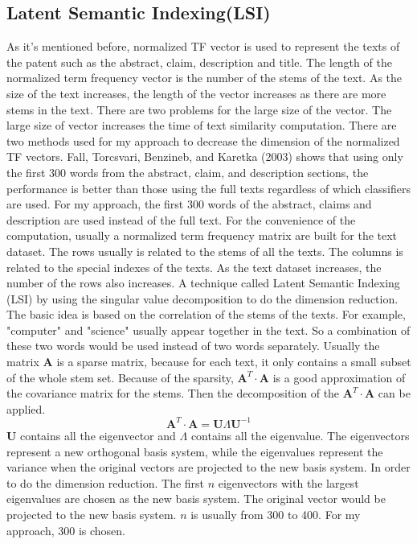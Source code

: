 \subsection{Latent Semantic Indexing(LSI)}
As it's mentioned before, normalized TF vector is used to represent the texts of the patent such as the abstract, claim, description and title. The length of the normalized term frequency vector is the number of the stems of the text. As the size of the text increases, the length of the vector increases as there are more stems in the text. There are two problems for the large size of the vector. The large size of vector increases the time of text similarity computation. There are two methods used for my approach to decrease the dimension of  the normalized TF vectors. Fall, Torcsvari, Benzineb, and Karetka (2003) shows that  using only the first 300
words from the abstract, claim, and description sections, the performance is better than those using the full texts regardless of which classifiers are used\cite{tseng2007text}. For my approach, the first 300 words of the abstract, claims and description are used instead of the full text. For the convenience of the computation, usually a normalized term frequency matrix are built for the text dataset. The rows usually is related to the stems of all the texts. The columns is related to the special indexes of the texts. As the text dataset increases, the number of the rows  also increases.  A technique called Latent Semantic Indexing (LSI) by using the singular value decomposition to do the dimension reduction. The basic idea is based on the correlation of the stems of the texts. For example, "computer" and "science" usually appear together in the text. So a combination of these two words would be used instead of two words separately. Usually the matrix $\textbf{A}$ is a sparse matrix, because for each text, it only contains a small subset of the whole stem set. Because of the sparsity, $\textbf{A}^T \cdot \textbf{A}$ is a good approximation of the covariance matrix for the stems. Then the decomposition of the $\textbf{A}^T \cdot \textbf{A}$ can be applied.
\begin{equation}
\textbf{A}^T \cdot \textbf{A} = \textbf{U} \Lambda \textbf{U}^{-1}
\end{equation}
$\textbf{U}$ contains all the eigenvector and $\Lambda$ contains all the eigenvalue. The eigenvectors represent a new orthogonal basis system, while the eigenvalues represent the variance when the original vectors are projected to the new basis system. In order to do the dimension reduction. The first $n$ eigenvectors with the largest eigenvalues are chosen as the new basis system. The original vector would be projected to the new basis system. $n$ is usually from 300 to 400\cite{ASTCA}. For my approach, 300 is chosen. 

